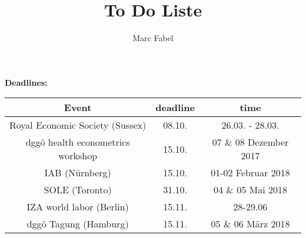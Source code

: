 \documentclass[11pt,a4paper]{article}
\author{Marc Fabel}
\title{To Do Liste}
\date{\flushleft{Last revision of the document: \today}}
\begin{document}
\maketitle




\textbf{Deadlines:}\newline
\begin{tabular}{ccc}
\hline 
Event & deadline & time	 \\ 
\hline 
Royal Economic Society (Sussex) &  08.10.     &26.03. - 28.03. \\
dggö health econometrics workshop & 15.10. & 07 \& 08 Dezember 2017 \\ 
IAB (Nürnberg) & 15.10. & 01-02 Februar 2018 \\
SOLE (Toronto) & 31.10. & 04 \& 05 Mai 2018\\
IZA world labor (Berlin) & 15.11. & 28-29.06\\
dggö Tagung (Hamburg)& 15.11. & 05 \& 06 März 2018 \\ 
\hline 
\end{tabular} 
\end{document}
